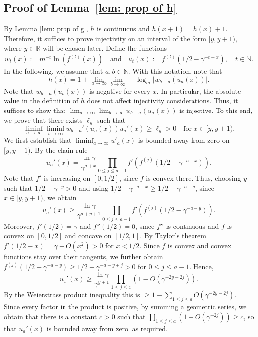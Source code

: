 \documentclass[11pt]{article}
\numberwithin{theorem}{section}
\begin{document}
\subsection{Proof of Lemma~\ref{lem: prop of h}}\label{sec: proof of prop of h}
    By Lemma \ref{lem: prop of g}, $h$ is continuous and $h(x+1)=h(x)+1$. Therefore, it suffices to prove injectivity on an interval of the form $[y,y+1)$, where $y\in\mathbb{R}$ will be chosen later. 
    Define the functions
    \[
    w_t(x):=m^{-t}\ln (f^{(t)}(x)) \quad \text{and} \quad u_t(x):=f^{(t)}(1/2-\gamma^{-t-x}),
    \quad t\in\mathbb{N}.
    \]
    In the following, we assume that $a,b\in\mathbb{N}$. With this notation, note that
    \[
        h(x)= 1+\lim_{a\to\infty}\lim_{b\to \infty}-\log_{m}|w_{b-a}(u_a(x))|.
    \]
    Note that $w_{b-a}(u_a(x))$ is negative for every $x$. In particular, the absolute value in the definition of $h$ does not affect injectivity considerations. Thus, it suffices to show that $\lim_{a\to\infty}\lim_{b\to \infty}w_{b-a}(u_a(x))$ is injective.
    To this end, we prove that there exists $\ell_y$ such that
    \[
    \liminf_{a\to\infty}\liminf_{b\to \infty}w_{b-a}'(u_a(x)) u_a'(x)\geq \ell_y >0
    \quad \text{for } x\in [y,y+1).
    \]
 We first establish that $\liminf_{a\to \infty} u'_a(x)$ is bounded away from zero on $[y,y+1)$. By the chain rule
    \[
    u_a'(x)= \frac{\ln\gamma}{\gamma^{a+x}} \prod_{0\leq j\leq a-1}f'(f^{(j)}(1/2-\gamma^{-a-x})).
    \]
    Note that $f'$ is increasing on $[0,1/2]$, since $f$ is convex there. Thus, choosing $y$ such that $1/2-\gamma^{-y}>0$ and using $1/2-\gamma^{-a-x}\geq 1/2-\gamma^{-a-y}$, since $x\in[y,y+1)$, we obtain
    \[
    u_a'(x)\geq \frac{\ln\gamma}{\gamma^{a+y+1}}\prod_{0\leq j\leq a-1}f'(f^{(j)}(1/2-\gamma^{-a-y})).
    \]
    Moreover, $f'(1/2)=\gamma$ and $f''(1/2)=0$, since $f''$ is continuous and $f$ is convex on $[0,1/2]$ and concave on $[1/2,1]$. 
    By Taylor's theorem $f'(1/2-x)=\gamma-O(x^2)>0$ for $x< 1/2$.
    Since $f$ is convex and convex functions stay over their tangents, we further obtain $f^{(j)}(1/2-\gamma^{-a-y})\geq 1/2-\gamma^{-a-y+j}>0$ for $0\leq j \leq a-1$. Hence,
    \[
        u_a'(x)
        \ge
        \frac{\ln\gamma}{\gamma^{y+1}}\prod_{1\leq j \leq a}\left(1-O(\gamma^{-2y-2j})\right).
    \]
    By the Weierstrass product inequality this is $\ge 1-\sum_{1\leq j\leq a}O(\gamma^{-2y-2j})$. Since every factor in the product is positive, by summing a geometric series, we obtain that there is a constant $c>0$ such that $\prod_{1\leq j \leq a}\left(1-O(\gamma^{-2j})\right)\geq c$, so that $u_a'(x)$ is bounded away from zero, as required.
\end{document}
